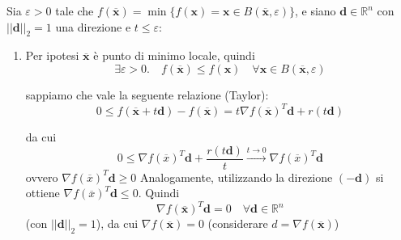 \begin{thproof} Sia $ \varepsilon > 0$ tale che $f(\mathbf{\overline{x}})
= \min \{ f(\mathbf{x}) = \mathbf{x} \in B(\mathbf{\overline{x}},
\varepsilon)\}$, e siano $\mathbf{d} \in \mathbb{R}^{n}$ con
$||\mathbf{d}||_{2}=1$ una direzione e $ t \leq \varepsilon$:
 \begin{enumerate}
  \item Per ipotesi $\mathbf{\overline{x}}$ è punto di minimo locale,
quindi
 $$ \exists \varepsilon > 0.  \quad f(\mathbf{\overline{x}}) 
\leq f(\mathbf{x}) \quad \forall \mathbf{x} \in 
B(\mathbf{\mathbf{\overline{x}}}, \varepsilon)$$

sappiamo che vale la seguente relazione (Taylor):
$$ 0 \leq f(\mathbf{\overline{x}} + t\mathbf{d}) - f(\mathbf{\overline{x}}) = 
t \nabla f(\mathbf{\overline{x}})^{T}\mathbf{d} + r(t \mathbf{d}) $$

da cui
$$ 0 \leq \nabla f(\overline{x})^{T}\mathbf{d} + \dfrac{r(t\mathbf{d})}{t} \xrightarrow{t \to 0}
\nabla f(\overline{x})^{T}\mathbf{d}$$ ovvero $\nabla
f(\overline{x})^{T}\mathbf{d} \geq 0$ Analogamente, utilizzando la
direzione $(-\mathbf{d})$ si ottiene $\nabla
f(\overline{x})^{T}\mathbf{d} \leq 0$.  Quindi
$$\nabla f(\mathbf{\overline{x}})^{T}\mathbf{d} =0 \quad \forall \mathbf{d} \in \mathbb{R}^{n}$$
(con $||\mathbf{d}||_{2}=1$), da cui $\nabla
f(\mathbf{\overline{x}})=0$ (considerare $d = \nabla
f(\mathbf{\overline{x}})$)



\end{enumerate}
\end{thproof}

